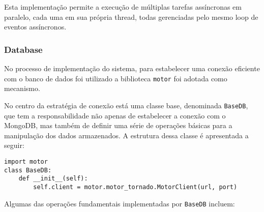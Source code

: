Esta implementação permite a execução de múltiplas tarefas assíncronas em paralelo, cada uma em sua própria thread, todas gerenciadas pelo mesmo loop de eventos assíncronos.

\subsubsection{Database}\label{subsubsec:DatabaseImpl}
No processo de implementação do sistema, para estabelecer uma conexão eficiente com o banco de dados foi utilizado a biblioteca \texttt{motor} foi adotada como mecanismo.

No centro da estratégia de conexão está uma classe base, denominada \texttt{BaseDB}, que tem a responsabilidade não apenas de estabelecer a conexão com o MongoDB, mas também de definir uma série de operações básicas para a manipulação dos dados armazenados. A estrutura dessa classe é apresentada a seguir:

\begin{verbatim}
import motor
class BaseDB:
    def __init__(self):
        self.client = motor.motor_tornado.MotorClient(url, port)
\end{verbatim}

Algumas das operações fundamentais implementadas por \texttt{BaseDB} incluem:

